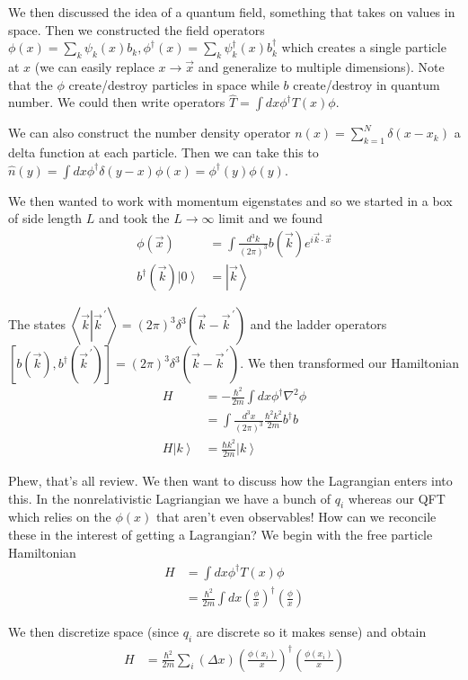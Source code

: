 \documentclass[10pt]{report}
\newcommand{\ket}[1]{\left|#1\right>}
\newcommand{\dotp}[2]{\left<#1\left.\right|#2\right>}
\newcommand{\pvec}[1]{\vec{#1}^{\,\prime}}
\begin{document}
We then discussed the idea of a quantum field, something that takes on values in space. Then we constructed the field operators $\phi(x) = \sum_{k}^{}\psi_k(x)b_k, \phi^\dagger(x) = \sum_{k}^{}\psi_k^\dagger(x)b_k^\dagger$ which creates a single particle at $x$ (we can easily replace $x \to \vec{x}$ and generalize to multiple dimensions). Note that the $\phi$ create/destroy particles in space while $b$ create/destroy in quantum number. We could then write operators $\hat{T} = \int dx \phi^\dagger T(x)\phi$.

We can also construct the number density operator $n(x) = \sum_{k=1}^{N}\delta(x - x_k)$ a delta function at each particle. Then we can take this to $\hat{n}(y) = \int dx \phi^\dagger \delta(y-x) \phi(x) = \phi^\dagger(y)\phi(y)$.

We then wanted to work with momentum eigenstates and so we started in a box of side length $L$ and took the $L \to \infty$ limit and we found
\begin{align}
    \phi(\vec{x}) &= \int \frac{d^3k}{(2\pi)^3}b(\vec{k})e^{i\vec{k}\cdot \vec{x}}\\
    b^\dagger(\vec{k})\ket{0} &= \ket{\vec{k}}
\end{align}

The states $\dotp{\vec{k}}{\pvec{k}} = (2\pi)^3 \delta^3(\vec{k} - \pvec{k})$ and the ladder operators $[b(\vec{k}), b^\dagger(\pvec{k})] = (2\pi)^3\delta^3(\vec{k} - \pvec{k})$. We then transformed our Hamiltonian
\begin{align}
    H &= -\frac{\hbar^2}{2m}\int dx \phi^\dagger \nabla ^2 \phi\\
    &= \int \frac{d^3x}{(2\pi)^3}\frac{\hbar^2 k^2}{2m}b^\dagger b\\
    H\ket{k} &= \frac{\hbar k^2}{2m}\ket{k}
\end{align}

Phew, that's all review. We then want to discuss how the Lagrangian enters into this. In the nonrelativistic Lagriangian we have a bunch of $q_i$ whereas our QFT which relies on the $\phi(x)$ that aren't even observables! How can we reconcile these in the interest of getting a Lagrangian? We begin with the free particle Hamiltonian
\begin{align}
    H &= \int dx \phi^\dagger T(x) \phi\\
    &= \frac{\hbar^2}{2m} \int dx \left( \frac{\phi}{x} \right)^\dagger\left( \frac{\phi}{x} \right)
\end{align}

We then discretize space (since $q_i$ are discrete so it makes sense) and obtain
\begin{align}
    H &= \frac{\hbar^2}{2m}\sum_{i}^{}(\Delta x) \left( \frac{\phi(x_i)}{x} \right)^\dagger\left( \frac{\phi(x_i)}{x} \right)
\end{align}
\end{document}
